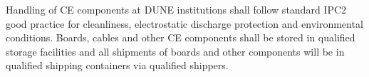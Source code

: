 Handling of CE components at DUNE institutions shall follow standard IPC2 good practice for cleanliness, electrostatic discharge protection and environmental conditions. Boards, cables and other CE components shall be stored in qualified storage facilities and all shipments of boards and other components will be in qualified shipping containers via qualified shippers.
